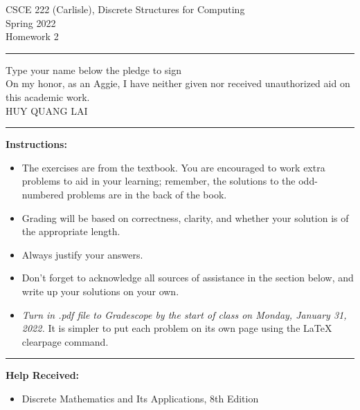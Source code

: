 \documentclass[12pt]{article}  %
\begin{document}
\begin{center}         %
{\large                %
CSCE 222 (Carlisle), Discrete Structures for Computing \\  %
Spring 2022 \\
Homework 2}
\end{center}
\rule{6in}{.1pt}       %
\begin{center}
{\large
Type your name below the pledge to sign\\
On my honor, as an Aggie, I have neither given nor received unauthorized aid on this academic work.\\
HUY QUANG LAI}
\end{center}


\rule{6in}{.1pt}       %
                    
\noindent              %
{\bf Instructions:}    %

\begin{itemize}        %
\item The exercises are from the textbook.  You are encouraged to work
      extra problems to aid in your learning; remember, the solutions to 
      the odd-numbered problems are in the back of the book.
\item Grading will be based on correctness, clarity, and whether your
      solution is of the appropriate length.
\item Always justify your answers.
\item Don't forget to acknowledge all sources of assistance in the section below, and write up your solutions on your own.
\item {\em Turn in .pdf file to Gradescope by the start of class on Monday, January 31, 2022.} It is simpler to put each problem on its own page using the LaTeX clearpage command.
\end{itemize}

\rule{6in}{.1pt}       %

{\bf Help Received:}    %
\begin{itemize}
    \item Discrete Mathematics and Its Applications, 8th Edition
\end{itemize}
\end{document}
